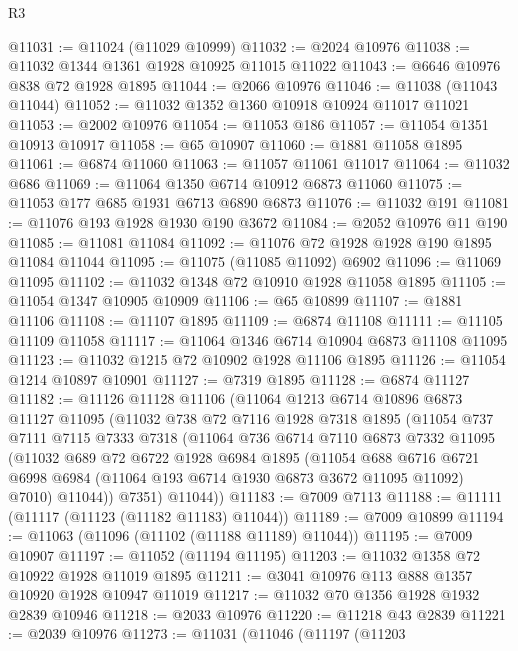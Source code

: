 \begin{lexlean}{R3}
\begin{coremodule}
@11031 := @11024 (@11029 @10999)
@11032 := @2024 @10976
@11038 := @11032 @1344 @1361 @1928 @10925 @11015 @11022
@11043 := @6646 @10976 @838 @72 @1928 @1895
@11044 := @2066 @10976
@11046 := @11038 (@11043 @11044)
@11052 := @11032 @1352 @1360 @10918 @10924 @11017 @11021
@11053 := @2002 @10976
@11054 := @11053 @186
@11057 := @11054 @1351 @10913 @10917
@11058 := @65 @10907
@11060 := @1881 @11058 @1895
@11061 := @6874 @11060
@11063 := @11057 @11061 @11017
@11064 := @11032 @686
@11069 := @11064 @1350 @6714 @10912 @6873 @11060
@11075 := @11053 @177 @685 @1931 @6713 @6890 @6873
@11076 := @11032 @191
@11081 := @11076 @193 @1928 @1930 @190 @3672
@11084 := @2052 @10976 @11 @190
@11085 := @11081 @11084
@11092 := @11076 @72 @1928 @1928 @190 @1895 @11084 @11044
@11095 := @11075 (@11085 @11092) @6902
@11096 := @11069 @11095
@11102 := @11032 @1348 @72 @10910 @1928 @11058 @1895
@11105 := @11054 @1347 @10905 @10909
@11106 := @65 @10899
@11107 := @1881 @11106
@11108 := @11107 @1895
@11109 := @6874 @11108
@11111 := @11105 @11109 @11058
@11117 := @11064 @1346 @6714 @10904 @6873 @11108 @11095
@11123 := @11032 @1215 @72 @10902 @1928 @11106 @1895
@11126 := @11054 @1214 @10897 @10901
@11127 := @7319 @1895
@11128 := @6874 @11127
@11182 := @11126
    @11128
    @11106
    (@11064
      @1213
      @6714
      @10896
      @6873
      @11127
      @11095
      (@11032
        @738
        @72
        @7116
        @1928
        @7318
        @1895
        (@11054
          @737
          @7111
          @7115
          @7333
          @7318
          (@11064
            @736
            @6714
            @7110
            @6873
            @7332
            @11095
            (@11032
              @689
              @72
              @6722
              @1928
              @6984
              @1895
              (@11054
                @688
                @6716
                @6721
                @6998
                @6984
                (@11064 @193 @6714 @1930 @6873 @3672 @11095 @11092)
                @7010)
              @11044))
          @7351)
        @11044))
@11183 := @7009 @7113
@11188 := @11111 (@11117 (@11123 (@11182 @11183) @11044))
@11189 := @7009 @10899
@11194 := @11063 (@11096 (@11102 (@11188 @11189) @11044))
@11195 := @7009 @10907
@11197 := @11052 (@11194 @11195)
@11203 := @11032 @1358 @72 @10922 @1928 @11019 @1895
@11211 := @3041 @10976 @113 @888 @1357 @10920 @1928 @10947 @11019
@11217 := @11032 @70 @1356 @1928 @1932 @2839 @10946
@11218 := @2033 @10976
@11220 := @11218 @43 @2839
@11221 := @2039 @10976
@11273 := @11031
    (@11046
      (@11197
        (@11203

\end{coremodule}
\end{lexlean}
